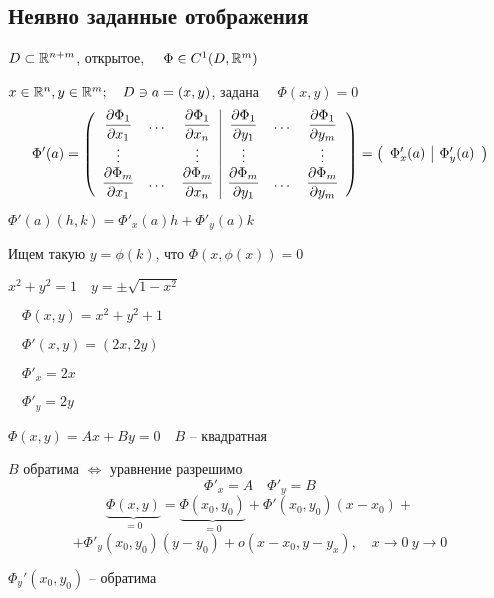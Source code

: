     \subsection*{Неявно заданные отображения}

    $D \subset \mathbb{R}^{n+m}$, открытое, $\quad \Phi \in C^1(D, \mathbb{R}^m)$
    \par $x \in \mathbb{R}^n, y \in \mathbb{R}^m; \quad 
    D \ni a = (x, y)$, задана $\quad \Phi(x, y) = 0$
    \[
        \Phi'(a) = \left(\begin{array}{c c c | c c c}
            \dfrac{\partial \Phi_1}{\partial x_1} & \dots & \dfrac{\partial \Phi_1}{\partial x_n} & \dfrac{\partial \Phi_1}{\partial y_1} & \dots & \dfrac{\partial \Phi_1}{\partial y_m} \\
            \vdots & & \vdots & \vdots & & \vdots \\
            \dfrac{\partial \Phi_m}{\partial x_1} & \dots & \dfrac{\partial \Phi_m}{\partial x_n} & \dfrac{\partial \Phi_m}{\partial y_1} & \dots & \dfrac{\partial \Phi_m}{\partial y_m} \\
        \end{array}\right) = \left(\begin{array}{c | c}
            \Phi_x'(a) & \Phi_y'(a)
        \end{array}\right)
    \]

    \par $\Phi'(a)(h, k) = \Phi'_x(a)h + \Phi'_y(a)k$
    \par Ищем такую $y = \phi(k)$, что $\Phi(x, \phi(x)) = 0$

    \begin{illustration}
        $x^2 + y^2 = 1 \quad y = \pm \sqrt{1 - x^2}$
        \par $\quad \Phi(x, y) = x^2 + y^2 + 1$
        \par $\quad \Phi'(x, y) = (2x, 2y)$
        \par $\quad \Phi'_x = 2x$
        \par $\quad \Phi'_y = 2y$
    \end{illustration}

    \begin{illustration}
        $\Phi(x, y) = Ax + By = 0 \quad B$ -- квадратная
        \par \quad $B$ обратима $\Leftrightarrow$ уравнение разрешимо
        \[
            \Phi'_x = A \quad \Phi'_y = B    
        \]
        \[
            \underbrace{\Phi(x, y)}_{=0} = \underbrace{\Phi(x_0, y_0)}_{=0} + \Phi'(x_0, y_0)(x - x_0) +    
        \]
        \[
            + \Phi'_y(x_0, y_0)(y - y_0) + o(x-x_0, y-y_x), \quad x \rightarrow 0 \ y \rightarrow 0    
        \]
        \par $\Phi_y'(x_0, y_0)$ -- обратима
    \end{illustration}

